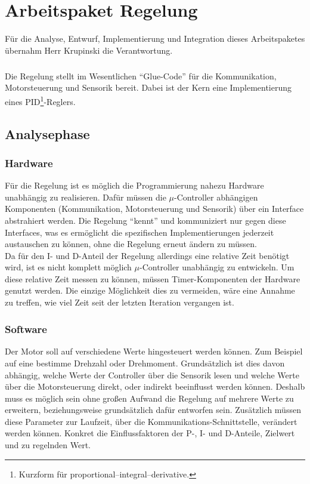 \graphicspath{{./regulation/}}
\chapter{Arbeitspaket Regelung}
Für die Analyse, Entwurf, Implementierung und Integration dieses Arbeitspaketes übernahm Herr Krupinski die Verantwortung.
\paragraph{}
Die Regelung stellt im Wesentlichen ``Glue-Code'' für die Kommunikation, Motorsteuerung und Sensorik bereit. Dabei ist der Kern eine Implementierung eines PID\footnote{Kurzform für proportional–integral–derivative.}-Reglers.
\section{Analysephase}
\subsection{Hardware}
Für die Regelung ist es möglich die Programmierung nahezu Hardware unabhängig zu realisieren. Dafür müssen die $\mu$-Controller abhängigen Komponenten (Kommunikation, Motorsteuerung und Sensorik) über ein Interface abstrahiert werden. Die Regelung ``kennt'' und kommuniziert nur gegen diese Interfaces, was es ermöglicht die spezifischen Implementierungen jederzeit austauschen zu können, ohne die Regelung erneut ändern zu müssen.\\
Da für den I- und D-Anteil der Regelung allerdings eine relative Zeit benötigt wird, ist es nicht komplett möglich $\mu$-Controller unabhängig zu entwickeln. Um diese relative Zeit messen zu können, müssen Timer-Komponenten der Hardware genutzt werden. Die einzige Möglichkeit dies zu vermeiden, wäre eine Annahme zu treffen, wie viel Zeit seit der letzten Iteration vergangen ist.
\paragraph{}
\subsection{Software}
Der Motor soll auf verschiedene Werte hingesteuert werden können. Zum Beispiel auf eine bestimme Drehzahl oder Drehmoment. Grundsätzlich ist dies davon abhängig, welche Werte der Controller über die Sensorik lesen und welche Werte über die Motorsteuerung direkt, oder indirekt beeinflusst werden können. Deshalb muss es möglich sein ohne großen Aufwand die Regelung auf mehrere Werte zu erweitern, beziehungsweise grundsätzlich dafür entworfen sein. Zusätzlich müssen diese Parameter zur Laufzeit, über die Kommunikations-Schnittstelle, verändert werden können. Konkret die Einflussfaktoren der P-, I- und D-Anteile, Zielwert und zu regelnden Wert.
\newpage
